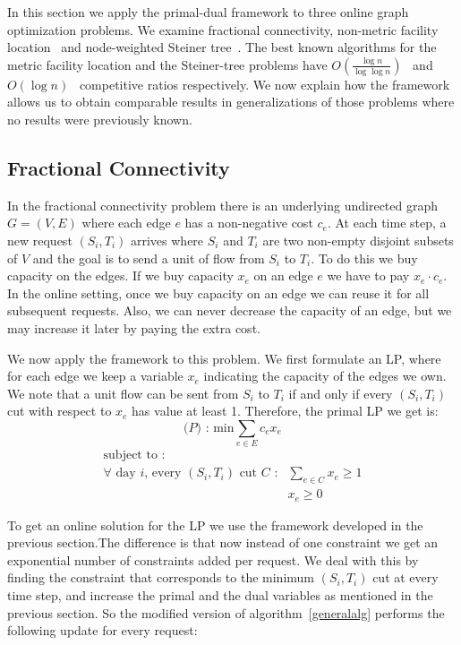 In this section we apply the primal-dual framework to three online graph optimization problems. We examine fractional connectivity, non-metric facility location~\cite{Alon06:opt} and node-weighted Steiner tree~\cite{naor11:node-weighted-steiner-tree}. The best known algorithms for the metric facility location and the Steiner-tree problems have $O(\frac{ \log n }{ \log \log n} )$~\cite{fotakis03:facility} and $O({ \log n} )$~\cite{imase91:dynamic-steiner} competitive ratios respectively. We now explain how the framework allows us to obtain comparable results in generalizations of those problems where no results were previously known.

\subsection{Fractional Connectivity}

In the fractional connectivity problem there is an underlying undirected graph $G = (V,E)$ where each edge $e$ has a non-negative cost $c_e$. At each time step, a new request $(S_i,T_i)$ arrives where $S_i$ and $T_i$ are two non-empty disjoint subsets of $V$ and the goal is to send a unit of flow from $S_i$ to $T_i$. To do this we buy capacity on the edges. If we buy capacity $x_e$ on an edge $e$ we have to pay $x_e \cdot c_e$. In the online setting, once we buy capacity on an edge we can reuse it for all subsequent requests. Also, we can never decrease the capacity of an edge, but we may increase it later by paying the extra cost.

We now apply the framework to this problem. We first formulate an LP, where for each edge we keep a variable $x_e$ indicating the capacity of the edges we own. We note that a unit flow can be sent from $S_i$ to $T_i$ if and only if every $(S_i, T_i)$ cut with respect to $x_e$ has value at least 1. Therefore, the primal LP we get is: 
\[
\textrm{($P$) : min}  \sum_{e \in E} c_e x_e
\]
\[
	\begin{array}{rr}
	\textrm{subject to :} & \\
		\textrm{$\forall$ day $i$, every $(S_i,T_i)$ cut $C$} \textrm{ :} & \sum_{e \in C} x_e  \ge 1  \\
			    & x_e \geq 0
	\end{array}
\]

To get an online solution for the LP we use the framework developed in the previous section.The difference is that now instead of one constraint we get an exponential number of constraints added per request. We deal with this by finding the constraint that corresponds to the minimum $(S_i,T_i)$ cut at every time step, and increase the primal and the dual variables as mentioned in the previous section. 
So the modified version of algorithm~\ref{generalalg} performs the following update for every request:

